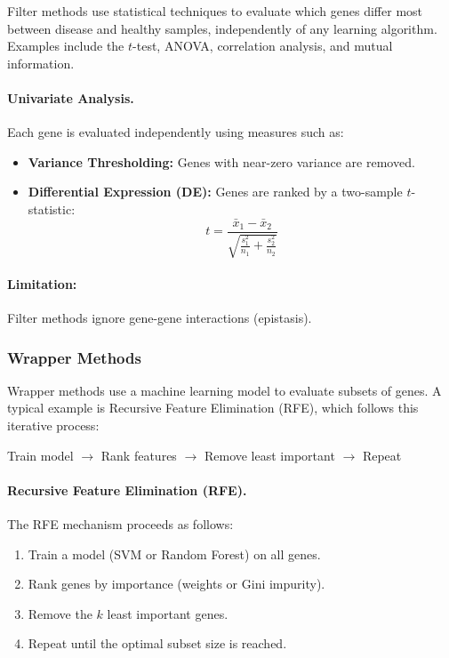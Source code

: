 Filter methods use statistical techniques to evaluate which genes differ most between disease and healthy samples, independently of any learning algorithm. Examples include the $t$-test, ANOVA, correlation analysis, and mutual information.

\paragraph{Univariate Analysis.} Each gene is evaluated independently using measures such as:
\begin{itemize}
    \item \textbf{Variance Thresholding:} Genes with near-zero variance are removed.
    \item \textbf{Differential Expression (DE):} Genes are ranked by a two-sample $t$-statistic:
    \begin{equation}
        t = \frac{\bar{x}_1 - \bar{x}_2}{\sqrt{\frac{s_1^2}{n_1} + \frac{s_2^2}{n_2}}}
    \end{equation}
\end{itemize}

\paragraph{Limitation:} Filter methods ignore gene-gene interactions (epistasis).

\subsubsection{Wrapper Methods}

Wrapper methods use a machine learning model to evaluate subsets of genes. A typical example is Recursive Feature Elimination (RFE), which follows this iterative process:
\begin{center}
    Train model $\rightarrow$ Rank features $\rightarrow$ Remove least important $\rightarrow$ Repeat
\end{center}

\paragraph{Recursive Feature Elimination (RFE).} The RFE mechanism proceeds as follows:
\begin{enumerate}
    \item Train a model (SVM or Random Forest) on all genes.
    \item Rank genes by importance (weights or Gini impurity).
    \item Remove the $k$ least important genes.
    \item Repeat until the optimal subset size is reached.
\end{enumerate}

